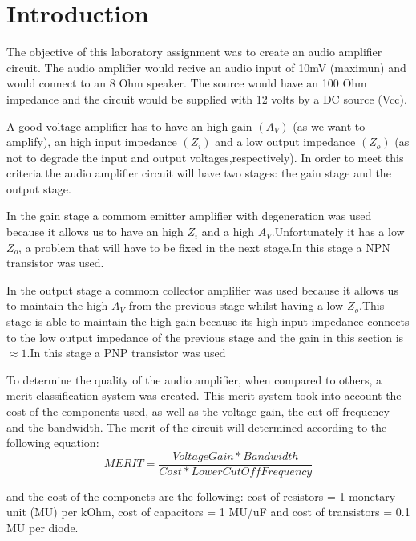 \section{Introduction}
\label{sec:introduction}


\par The objective of this laboratory assignment was to create an audio amplifier circuit. The audio amplifier would recive an audio input of 10mV (maximun) and would connect to an 8 Ohm speaker. The source would have an 100 Ohm impedance and the circuit would be supplied with 12 volts by a DC source (Vcc).
\par A good voltage amplifier has to have an high gain $(A_{V})$ (as we want to amplify), an high input impedance $(Z_{i})$ and a low output impedance $(Z_{o})$ (as not to degrade the input and output voltages,respectively). In order to meet this criteria the audio amplifier circuit will have two stages: the gain stage and the output stage.\par
 In the gain stage a commom emitter amplifier with degeneration was used because it allows us to have an high $Z_{i}$ and a high $A_{V}$.Unfortunately it has a low $Z_{o}$, a problem that will have to be fixed in the next stage.In this stage a NPN transistor was used.\par
 In the output stage a commom collector amplifier  was used because it allows us to maintain  the high $A_{V}$ from the previous stage whilst having a low $Z_{o}$.This stage is able to maintain the high gain because its high input impedance connects to the low output impedance of the previous stage and the gain in this section is $\approx 1$.In this stage a PNP transistor was used
\par   
To determine the quality of the audio amplifier, when compared to others, a merit classification system was created. This merit system took into account the cost of the components used, as well as the voltage gain, the cut off frequency and the bandwidth. The merit of the circuit will determined according to the following equation: 
\begin {equation}
	 MERIT = \frac{Voltage Gain*Bandwidth}{Cost*Lower Cut Off Frequency}   	
	\label{eq:i1}
\end{equation}

and the cost of the componets are the following: cost of resistors = 1 monetary unit (MU) per kOhm, cost of capacitors = 1 MU/uF
and cost of transistors = 0.1 MU per diode. 

